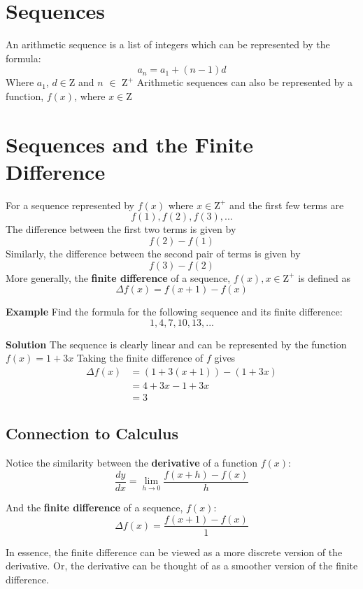 \section{Sequences}
An arithmetic sequence is a list of integers which can be represented by the formula:
\[a_n = a_1 + (n - 1)d\] Where \(a_1\), \(d \in \mbox{Z}\) and \(n\) \(\in\) \(\mbox{Z}^+\)
\newline
Arithmetic sequences can also be represented by a function, \(f(x)\), where \(x\in\mbox{Z}\)

\section{Sequences and the Finite Difference}
For a sequence represented by \(f(x)\) where \(x \in \mbox{Z}^+\) and the first few terms are \[f(1), f(2), f(3), ...\]
The difference between the first two terms is given by \[f(2) - f(1)\] 
Similarly, the difference between the second pair of terms is given by \[f(3) - f(2)\]
More generally, the \textbf{finite difference} of a sequence, \(f(x), x \in \mbox{Z}^+\) is defined as
\begin{equation} \label{eq:1}
    \Delta f(x) = f(x + 1) - f(x)
\end{equation}

\textbf{Example}
Find the formula for the following sequence and its finite difference: \[1,4,7,10,13,...\]

\textbf{Solution} 
The sequence is clearly linear and can be represented by the function \(f(x) = 1+3x\)
Taking the finite difference of \(f\) gives
\begin{align*}
    \Delta f(x) & = (1+3(x+1)) - (1 + 3x) \\
    & = 4+3x - 1+3x \\
    & = 3
\end{align*}

\subsection{Connection to Calculus}
Notice the similarity between the \textbf{derivative} of a function \(f(x)\): 
\begin{equation} \label{eq:2}
    \frac{dy}{dx} = \lim_{h \to 0}\frac{f(x+h) - f(x)}{h}
\end{equation}

And the \textbf{finite difference} of a sequence, \(f(x)\): 
\[\Delta f(x) = \frac{f(x+1) - f(x)}{1}\]

In essence, the finite difference can be viewed as a more discrete version of the derivative. Or, the derivative can be thought of as a smoother version of the finite difference.


